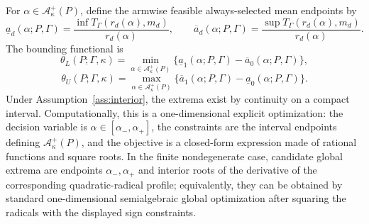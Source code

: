 \documentclass[11pt]{article}
\theoremstyle{definition}
\theoremstyle{plain}
\theoremstyle{remark}
\begin{document}
For \(\alpha\in\mathcal A_\kappa^+(P)\), define the armwise feasible
always-selected mean endpoints by
\[
  \underline a_d(\alpha;P,\Gamma)
  =
  \frac{\inf T_\Gamma(r_d(\alpha),m_d)}{r_d(\alpha)},
  \qquad
  \overline a_d(\alpha;P,\Gamma)
  =
  \frac{\sup T_\Gamma(r_d(\alpha),m_d)}{r_d(\alpha)}.
\]
The bounding functional is
\[
  \theta_L(P;\Gamma,\kappa)
  =
  \min_{\alpha\in\mathcal A_\kappa^+(P)}
  \{\underline a_1(\alpha;P,\Gamma)-\overline a_0(\alpha;P,\Gamma)\},
\]
\[
  \theta_U(P;\Gamma,\kappa)
  =
  \max_{\alpha\in\mathcal A_\kappa^+(P)}
  \{\overline a_1(\alpha;P,\Gamma)-\underline a_0(\alpha;P,\Gamma)\}.
\]
Under Assumption~\ref{ass:interior}, the extrema exist by continuity on
a compact interval.  Computationally, this is a one-dimensional explicit
optimization: the decision variable is \(\alpha\in[\alpha_-,\alpha_+]\), the
constraints are the interval endpoints defining \(\mathcal A_\kappa^+(P)\), and
the objective is a closed-form expression made of rational functions and square
roots.  In the finite nondegenerate case, candidate global extrema are
endpoints \(\alpha_-,\alpha_+\) and interior roots of the derivative of the
corresponding quadratic-radical profile; equivalently, they can be obtained by
standard one-dimensional semialgebraic global optimization after squaring the
radicals with the displayed sign constraints.
\end{document}
